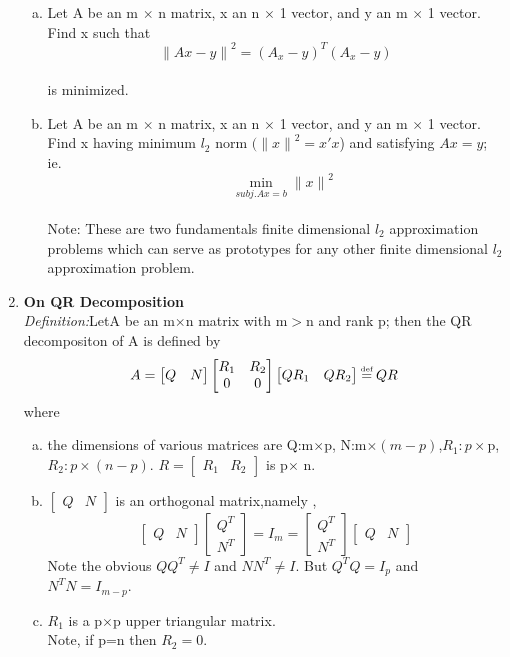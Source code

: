 \documentclass[journal,12pt,onecolumn]{IEEEtran}
\newcommand\myeq{\mathrel{\stackrel{\makebox[0pt]{\mbox{\normalfont\tiny def}}}{=}}}
\begin{document}
\begin{enumerate}
\begin{enumerate}[(a)]
\item Let A be an m $\times$ n matrix, x an n $\times$ 1 vector, and y an m $\times$ 1 vector. Find x such that\\
$${\|A{x}-y\|}^2 =(A_{x}-y)^T(A_{x}-y)$$\\
is minimized.\\
\item Let A be an m $\times$ n matrix, x an n $\times$ 1 vector, and y an m $\times$ 1 vector. Find x having minimum $l_2$ norm $({\|{x}\|}^2=x'x$) and satisfying $Ax=y$; ie.
$$ \quad\min_{subj.Ax=b}{\|{x}\|}^2$$\\
Note: These are two fundamentals finite dimensional $l_2$ approximation problems which can serve as prototypes for any other finite dimensional $l_2$ approximation problem.
\end{enumerate}
\item \textbf{On QR Decomposition}\\
\textit{Definition:}LetA be an m$\times$n matrix with m$>$n and rank p; then the QR decompositon of A is defined by\\
\begin{align*}
A=\begin{bmatrix}Q & N\end{bmatrix}
\begin{bmatrix}R_1&R_2\\0&0\end{bmatrix}\begin{bmatrix}QR_1&QR_2\end{bmatrix}&\myeq QR\\
\end{align*}
where
\begin{enumerate}[(a)]
\item the dimensions of various matrices are Q:m$\times$p, N:m$\times(m-p)$,$R_1:p\times$p,$R_2:p\times(n-p).$
$R=\begin{bmatrix} R_1&R_2\end{bmatrix}$ is p$\times$ n.
\item $\begin{bmatrix}Q&N\end{bmatrix}$ is an orthogonal matrix,namely ,
$$\begin{bmatrix}Q&N\end{bmatrix}
\begin{bmatrix}Q^T\\N^T\end{bmatrix}=I_m=\begin{bmatrix}Q^T\\N^T\end{bmatrix}
\begin{bmatrix}Q&N\end{bmatrix}$$
Note the obvious $QQ^T\neq I$ and $NN^T\neq I$. But $Q^TQ=I_{p}$ and $N^TN=I_{m-p}.$
\item $R_1$ is a p$\times$p upper triangular matrix.\\
Note, if p=n then $R_2=0.$
\end{enumerate}
\begin{enumerate}[(a)]


\end{enumerate}
\end{enumerate}
\end{document}
